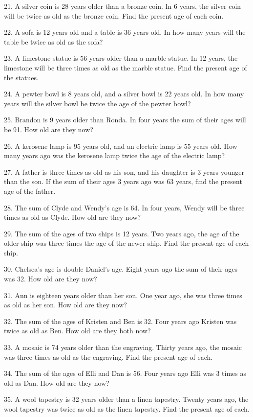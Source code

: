 21. A silver coin is 28 years older than a bronze coin. In 6 years, the silver
coin will be twice as old as the bronze coin. Find the
present age of each coin.

22. A sofa is 12 years old and a table is 36 years old. In how many years will
the table be twice as old as the sofa?

23. A limestone statue is 56 years older than a marble statue. In 12 years,
the limestone will be three times as old as the marble
statue. Find the present age of the statues.

24. A pewter bowl is 8 years old, and a silver bowl is 22 years old. In how
many years will the silver bowl be twice the age of the pewter
bowl?

25. Brandon is 9 years older than Ronda. In four years the sum of their ages
will be 91. How old are they now?

26. A kerosene lamp is 95 years old, and an electric lamp is 55 years old. How
many years ago was the kerosene lamp twice the age of the
electric lamp?

27. A father is three times as old as his son, and his daughter is 3 years
younger than the son. If the sum of their ages 3 years ago
was 63 years, find the present age of the father.

28. The sum of Clyde and Wendy's age is 64. In four years, Wendy will be three
times as old as Clyde. How old are they now?

29. The sum of the ages of two ships is 12 years. Two years ago, the age of
the older ship was three times the age of the newer ship.
Find the present age of each ship.

30. Chelsea's age is double Daniel's age. Eight years ago the sum of their
ages was 32. How old are they now?

31. Ann is eighteen years older than her son. One year ago, she was three
times as old as her son. How old are they now?

32. The sum of the ages of Kristen and Ben is 32. Four years ago Kristen was twice as old as Ben. How old are they both now?

33. A mosaic is 74 years older than the engraving. Thirty years ago, the
mosaic was three times as old as the engraving. Find the
present age of each.

34. The sum of the ages of Elli and Dan is 56. Four years ago Elli was 3 times
as old as Dan. How old are they now?

35. A wool tapestry is 32 years older than a linen tapestry. Twenty years ago,
the wool tapestry was twice as old as the linen tapestry. Find the
present age of each.

